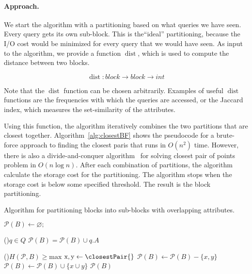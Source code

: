 \documentclass[twocolumn]{svjour3}          %
\let\emptyset\varnothing
\DeclareMathOperator{\dist}{dist}
\begin{document}
\paragraph*{Approach.} We start the algorithm with a 
 partitioning based on what queries we have seen.
Every query gets its own sub-block. This is the``ideal'' partitioning,
because the I/O cost would be minimized for every query that we would
have seen. As input to the algorithm, we provide a function $\dist$, which
is used to compute the distance between two blocks.

$$
\dist: block \rightarrow block \rightarrow int
$$

Note that the $\dist$ function can be chosen arbitrarily.  Examples of useful
$\dist$ functions are the frequencies with which the queries are accessed, or the Jaccard index, which measures the set-similarity of
the attributes.

Using this function, the algorithm iteratively combines the two partitions that
are closest together. Algorithm~\ref{alg:closestBF} shows the pseudocode for a brute-force approach
  to finding the closest paris that runs in $O(n^2)$ time. However, there is
  also a divide-and-conquer algorithm~\cite{cormen01} for solving closest pair
  of points problem in $O(n \log n)$.
After each combination of partitions, the algorithm calculate the storage cost
for the partitioning. The algorithm stops when the  storage cost is below some
specified threshold.  The result is the block partitioning.



\begin{algorithm}[h]
\scriptsize
\caption{Algorithm for partitioning blocks into sub-blocks with overlapping attributes.}
\label{alg:overlappingP}
$\mathcal{P}(B) \leftarrow \emptyset;$  

\For(){$q \in Q$}{ 
 $\mathcal{P}(B) = \mathcal{P}(B) \cup q.A$ 
}

\While(){$H(\mathcal{P}, B) \geq
  \text{max}$}{
$\text{x}, \text{y}  \leftarrow  \closestPair{}  $\;
 $ \mathcal{P}(B)  \leftarrow \mathcal{P}(B) - \{x, y\}$ \;
  $\mathcal{P}(B)  \leftarrow \mathcal{P}(B)  \cup \{ x \cup y \}$ \;
}
\Return $ \mathcal{P}(B)$  
\end{algorithm} 
\end{document}
